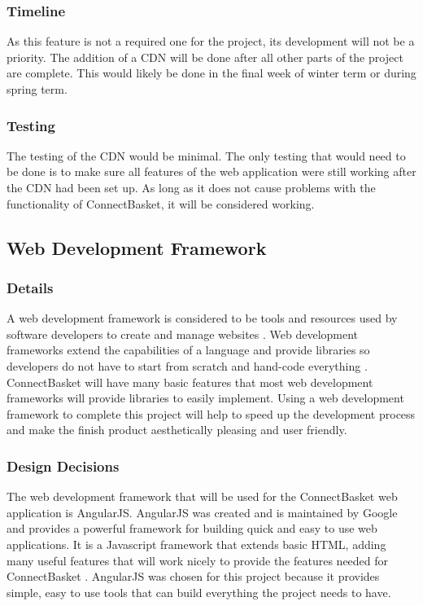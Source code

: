\documentclass[onecolumn, draftclsnofoot,10pt, compsoc]{IEEEtran}
\begin{document}
\subsubsection{Timeline}
As this feature is not a required one for the project, its development will not be a priority. The addition of a CDN will be done after all other parts of the project are complete. This would likely be done in the final week of winter term or during spring term.


\subsubsection{Testing}
The testing of the CDN would be minimal. The only testing that would need to be done is to make sure all features of the web application were still working after the CDN had been set up. As long as it does not cause problems with the functionality of ConnectBasket, it will be considered working.

\subsection{Web Development Framework}

\subsubsection{Details}
A web development framework is considered to be tools and resources used by software developers to create and manage websites \cite{webdevframework}. Web development frameworks extend the capabilities of a language and provide libraries so developers do not have to start from scratch and hand-code everything \cite{framework}. ConnectBasket will have many basic features that most web development frameworks will provide libraries to easily implement. Using a web development framework to complete this project will help to speed up the development process and make the finish product aesthetically pleasing and user friendly.

\subsubsection{Design Decisions}
The web development framework that will be used for the ConnectBasket web application is AngularJS. AngularJS was created and is maintained by Google and provides a powerful framework for building quick and easy to use web applications. It is a Javascript framework that extends basic HTML, adding many useful features that will work nicely to provide the features needed for ConnectBasket \cite{angular}. AngularJS was chosen for this project because it provides simple, easy to use tools that can build everything the project needs to have.
\end{document}
